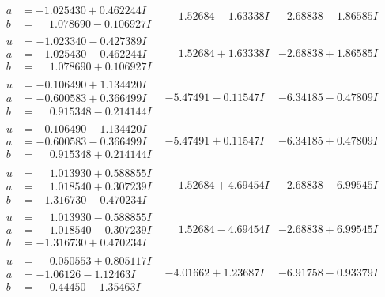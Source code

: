 \documentclass[1p]{elsarticle_modified}
\theoremstyle{definition}
\begin{document}
$$\begin{array}{c|c|c}
\begin{aligned}
a &= -1.025430 + 0.462244 I \\
b &= \phantom{-}1.078690 - 0.106927 I\end{aligned}
 & \phantom{-}1.52684 - 1.63338 I & -2.68838 - 1.86585 I \\ \hline\begin{aligned}
u &= -1.023340 - 0.427389 I \\
a &= -1.025430 - 0.462244 I \\
b &= \phantom{-}1.078690 + 0.106927 I\end{aligned}
 & \phantom{-}1.52684 + 1.63338 I & -2.68838 + 1.86585 I \\ \hline\begin{aligned}
u &= -0.106490 + 1.134420 I \\
a &= -0.600583 + 0.366499 I \\
b &= \phantom{-}0.915348 - 0.214144 I\end{aligned}
 & -5.47491 - 0.11547 I & -6.34185 - 0.47809 I \\ \hline\begin{aligned}
u &= -0.106490 - 1.134420 I \\
a &= -0.600583 - 0.366499 I \\
b &= \phantom{-}0.915348 + 0.214144 I\end{aligned}
 & -5.47491 + 0.11547 I & -6.34185 + 0.47809 I \\ \hline\begin{aligned}
u &= \phantom{-}1.013930 + 0.588855 I \\
a &= \phantom{-}1.018540 + 0.307239 I \\
b &= -1.316730 - 0.470234 I\end{aligned}
 & \phantom{-}1.52684 + 4.69454 I & -2.68838 - 6.99545 I \\ \hline\begin{aligned}
u &= \phantom{-}1.013930 - 0.588855 I \\
a &= \phantom{-}1.018540 - 0.307239 I \\
b &= -1.316730 + 0.470234 I\end{aligned}
 & \phantom{-}1.52684 - 4.69454 I & -2.68838 + 6.99545 I \\ \hline\begin{aligned}
u &= \phantom{-}0.050553 + 0.805117 I \\
a &= -1.06126 - 1.12463 I \\
b &= \phantom{-}0.44450 - 1.35463 I\end{aligned}
 & -4.01662 + 1.23687 I & -6.91758 - 0.93379 I \\ \hline\begin{aligned}

\end{aligned}
\end{array}$$
\end{document}
